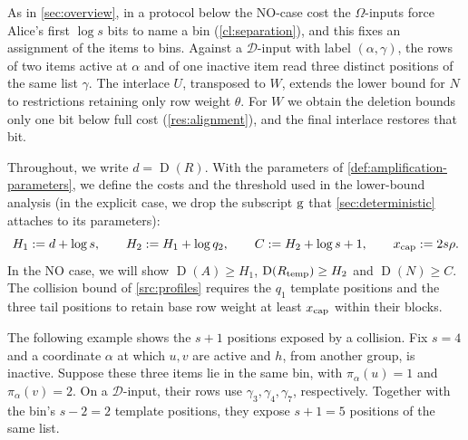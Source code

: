 \documentclass[11pt,letterpaper]{article} \usepackage[utf8]{inputenc}
\theoremstyle{plain} \newtheorem{theorem}{Theorem}[section]
\theoremstyle{definition} \newaliascnt{definition}{theorem}
\newcommand{\D}{\operatorname{D}}
\begin{document}
As in \cref{sec:overview}, in a protocol below the NO-case cost the
$\Omega$-inputs force Alice's first \(\log s\) bits to name a bin
(\cref{cl:separation}), and this fixes an assignment of the items to
bins. Against a $\mathcal D$-input with label \((\alpha,\gamma)\), the rows
of two items active at \(\alpha\) and of one inactive item read three
distinct positions of the same list \(\gamma\). The interlace \(U\),
transposed to \(W\), extends the lower bound for \(N\) to restrictions
retaining only row weight \(\theta\). For \(W\) we obtain the deletion bounds
only one bit below full cost (\cref{res:alignment}), and the final
interlace restores that bit.

Throughout, we write \(d=\D(R)\). With the parameters of
\cref{def:amplification-parameters}, we define the costs and the threshold
used in the lower-bound analysis (in the explicit case, we drop the
subscript \(\rm g\) that \cref{sec:deterministic} attaches to its
parameters):
\begin{equation}\label{eq:source-costs}
H_1:=d+\log s,\qquad H_2:=H_1+\log q_2,\qquad C:=H_2+\log s+1,\qquad
x_{\rm cap}:=2s\rho.
\end{equation}
In the NO case, we will show \(\D(A)\ge H_1\), \(\D(R_{\rm temp})\ge H_2\)
and \(\D(N)\ge C\). The collision bound of \cref{src:profiles}
requires the \(q_1\) template positions and the three tail positions to
retain base row weight at least \(x_{\rm cap}\) within their blocks.

The following example shows the \(s+1\) positions exposed by a collision.
Fix \(s=4\) and a coordinate \(\alpha\) at which \(u,v\) are active
and \(h\), from another group, is inactive. Suppose these three items
lie in the same bin, with \(\pi_\alpha(u)=1\) and
\(\pi_\alpha(v)=2\). On a \(\mathcal D\)-input, their rows use
\(\gamma_3,\gamma_4,\gamma_7\), respectively. Together with the
bin's \(s-2=2\) template positions, they expose \(s+1=5\) positions
of the same list.
\end{document}
